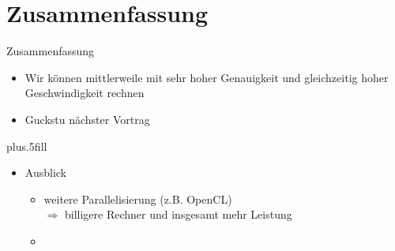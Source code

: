 \documentclass{beamer}
\begin{document}
\section{Zusammenfassung}
\begin{frame}{Zusammenfassung}

  \begin{itemize}
  \item
    Wir können mittlerweile mit sehr hoher Genauigkeit und gleichzeitig hoher
    Geschwindigkeit rechnen
  \item
    Guckstu nächster Vortrag
  \end{itemize}
  
  \vskip0pt plus.5fill
  \begin{itemize}
  \item
    Ausblick
    \begin{itemize}
    \item
      weitere Parallelisierung (z.B. OpenCL)\\
      $\Rightarrow$ billigere Rechner und insgesamt mehr Leistung
    \item

    \end{itemize}
  \end{itemize}
\end{frame}
\end{document}
